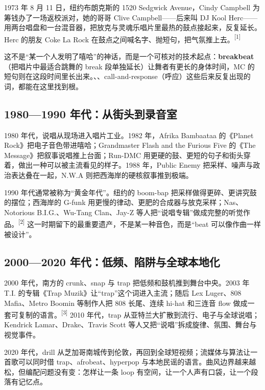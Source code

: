 1973 年 8 月 11 日，纽约布朗克斯的 1520 Sedgwick Avenue，Cindy Campbell 为筹钱办了一场返校派对，她的哥哥 Clive Campbell——后来叫 DJ Kool Herc——用两台唱盘和一台混音器，把放克与灵魂乐唱片里最热的鼓点接起来，反复延长。Herc 的朋友 Coke La Rock 在鼓点之间喊名字、抛短句，把气氛推上去。{\textsuperscript{[1]}}

这不是“某一个人发明了嘻哈”的神话，而是一个可核对的技术起点：{\bfseries breakbeat}（把唱片中最适合跳舞的 break 段单独延长）让舞者有更长的身体时间，MC 的短句则在这段时间里长出来。、、call-and-response（呼应）这些后来反复出现的词，都能在这里找到根。

\subsection{1980—1990 年代：从街头到录音室}
\label{sec:hiphop-history-1980s}

1980 年代，说唱从现场进入唱片工业。1982 年，Afrika Bambaataa 的《Planet Rock》把电子音色带进嘻哈；Grandmaster Flash and the Furious Five 的《The Message》把叙事说唱推上台面；Run-DMC 用更硬的鼓、更短的句子和街头穿着，做出一种可以被主流看见的样子。1988 年，Public Enemy 把采样、噪声与政治表达叠在一起，N.W.A 则把西海岸的硬核叙事推到极端。

1990 年代通常被称为“黄金年代”。纽约的 boom-bap 把采样做得更碎、更讲究鼓的摆位；西海岸的 G-funk 用更慢的律动、更肥的合成器与放克采样；Nas、Notorious B.I.G.、Wu-Tang Clan、Jay-Z 等人把“说唱专辑”做成完整的听觉作品。{\textsuperscript{[2]}} 这一时期留下的最重要遗产，不是某一种音色，而是“beat 可以像作曲一样被设计”。

\subsection{2000—2020 年代：低频、陷阱与全球本地化}
\label{sec:hiphop-history-2000s}

2000 年代，南方的 crunk、snap 与 trap 把低频和鼓机推到舞台中央。2003 年 T.I. 的专辑《Trap Muzik》让“trap”这个词进入主流；随后 Lex Luger、808 Mafia、Metro Boomin 等制作人把 808 长尾、连续 hi-hat 和三连音 flow 做成一套可复制的语言。{\textsuperscript{[3]}} 2010 年代，trap 从亚特兰大扩散到流行、电子与全球说唱；Kendrick Lamar、Drake、Travis Scott 等人又把“说唱”拆成旋律、氛围、舞台与视觉事件。

2020 年代，drill 从芝加哥南城传到伦敦，再回到全球短视频；流媒体与算法让一首歌可以同时借 trap、afrobeat、hyperpop 与本地民谣的语言。曲风边界越来越松，但编配问题没有变：怎样让一条 loop 有空间，让一个人声有口袋，让一个段落有记忆点。

